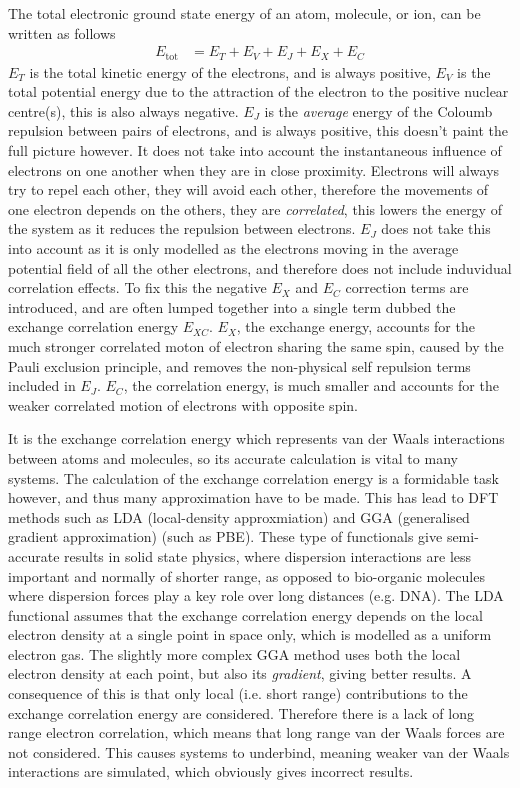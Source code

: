 \documentclass[10pt,a4paper,twocolumn,twoside]{extarticle}
\begin{document}
	The total electronic ground state energy of an atom, molecule, or ion, can be written as follows
	\begin{align}
		E_\text{tot} &= E_T + E_V + E_J + E_X + E_C
	\end{align}
	$E_T$ is the total kinetic energy of the electrons, and is always positive, $E_V$ is the total potential energy due to the attraction of the electron to the positive nuclear centre(s), this is also always negative. $E_J$ is the \emph{average} energy of the Coloumb repulsion between pairs of electrons, and is always positive, this doesn't paint the full picture however. 
	It does not take into account the instantaneous influence of electrons on one another when they are in close proximity. Electrons will always try to repel each other, they will avoid each other, therefore the movements of one electron depends on the others, they are \emph{correlated}, this lowers the energy of the system as it reduces the repulsion between electrons. $E_J$ does not take this into account as it is only modelled as the electrons moving in the average potential field of all the other electrons, and therefore does not include induvidual correlation effects. 
	To fix this the negative $E_X$ and $E_C$ correction terms are introduced, and are often lumped together into a single term dubbed the exchange correlation energy $E_{XC}$. 
	$E_X$, the exchange energy, accounts for the much stronger correlated moton of electron sharing the same spin, caused by the Pauli exclusion principle, and removes the non-physical self repulsion terms included in $E_J$. $E_C$, the correlation energy, is much smaller and accounts for the weaker correlated motion of electrons with opposite spin. 

	It is the exchange correlation energy which represents van der Waals interactions between atoms and molecules, so its accurate calculation is vital to many systems.
	The calculation of the exchange correlation energy is a formidable task however, and thus many approximation have to be made. This has lead to DFT methods such as LDA (local-density approxmiation)\cite{LDA-Kohn1965} and GGA (generalised gradient approximation)\cite{GGA-Becke1988,GGA-Perdew1986} (such as PBE\cite{PBE}). 
	These type of functionals give semi-accurate results in solid state physics, where dispersion interactions are less important and normally of shorter range, as opposed to bio-organic molecules where dispersion forces play a key role over long distances (e.g. DNA).\cite{vdWImportance-Kaplan2006} The LDA functional assumes that the exchange correlation energy depends on the local electron density at a single point in space only, which is modelled as a uniform electron gas.\cite{LDA-Kohn1965} The slightly more complex GGA method uses both the local electron density at each point, but also its \emph{gradient}, giving better results.\cite{GGA-Becke1988}\cite{GGA-Perdew1986} A consequence of this is that only local (i.e. short range) contributions to the exchange correlation energy are considered. Therefore there is a lack of long range electron correlation, which means that long range van der Waals forces are not considered. This causes systems to underbind, meaning weaker van der Waals interactions are simulated, which obviously gives incorrect results. 
\end{document}
